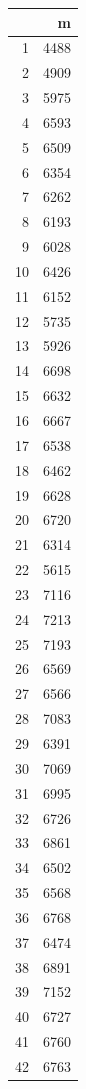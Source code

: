 \documentclass[12pt,english,french,twoside]{book}\usepackage[]{graphicx}\usepackage[]{color}
\begin{document}
\begin{table}[ht]
\centering
\begin{tabular}{rr}
  \hline
 & m \\ 
  \hline
1 & 4488 \\ 
  2 & 4909 \\ 
  3 & 5975 \\ 
  4 & 6593 \\ 
  5 & 6509 \\ 
  6 & 6354 \\ 
  7 & 6262 \\ 
  8 & 6193 \\ 
  9 & 6028 \\ 
  10 & 6426 \\ 
  11 & 6152 \\ 
  12 & 5735 \\ 
  13 & 5926 \\ 
  14 & 6698 \\ 
  15 & 6632 \\ 
  16 & 6667 \\ 
  17 & 6538 \\ 
  18 & 6462 \\ 
  19 & 6628 \\ 
  20 & 6720 \\ 
  21 & 6314 \\ 
  22 & 5615 \\ 
  23 & 7116 \\ 
  24 & 7213 \\ 
  25 & 7193 \\ 
  26 & 6569 \\ 
  27 & 6566 \\ 
  28 & 7083 \\ 
  29 & 6391 \\ 
  30 & 7069 \\ 
  31 & 6995 \\ 
  32 & 6726 \\ 
  33 & 6861 \\ 
  34 & 6502 \\ 
  35 & 6568 \\ 
  36 & 6768 \\ 
  37 & 6474 \\ 
  38 & 6891 \\ 
  39 & 7152 \\ 
  40 & 6727 \\ 
  41 & 6760 \\ 
  42 & 6763 \\ 

\end{tabular}
\end{table}
\end{document}
